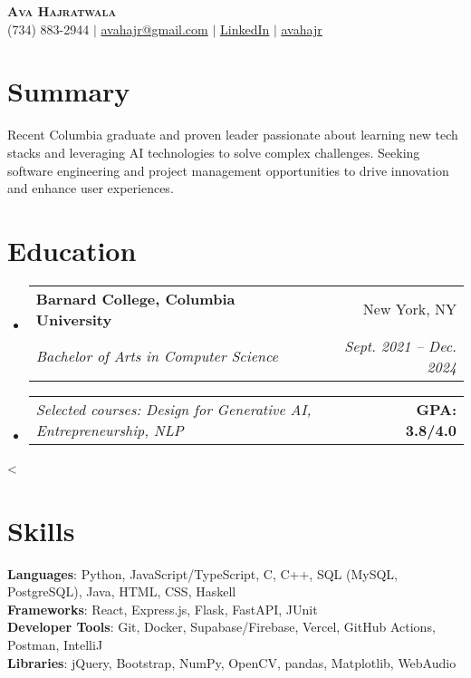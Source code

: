 \documentclass[letterpaper,11pt]{article}
\makeatletter
\newcommand{\resumeSubheading}[4]{
    \vspace{-2pt}\item
    \begin{tabular*}{0.97\textwidth}[t]{l@{\extracolsep{\fill}}r}
    \textbf{#1} & #2 \\
    \textit{\small#3} & \textit{\small #4} \\
    \end{tabular*}\vspace{-7pt}
}
\newcommand{\relevantCourseWorkAndGPA}[2]{
    \item
    \begin{tabular*}{0.97\textwidth}{l@{\extracolsep{\fill}}r}
    \textit{Selected courses: \small#1} & \textbf{\small GPA: #2/4.0} \\
    \end{tabular*}\vspace{-7pt}
}
\newcommand{\conditionalVspace}[1]{%
\ifnum\value{enumi}<\value{enumii}%
\vspace{#1}%
\fi
}
\newcommand{\resumeSubHeadingListStart}{\begin{itemize}[leftmargin=0.15in, label={}] \setlength{\itemsep}{7pt}}
\newcommand{\resumeSubHeadingListEnd}{\end{itemize}\conditionalVspace{7pt}}
\makeatother
\begin{document}

\begin{center}
\textbf{\Huge \scshape Ava Hajratwala} \\ \vspace{1pt}
\small (734) 883-2944 $|$ \href{mailto:avahajr@gmail.com}{{avahajr@gmail.com}} $|$
\href{https://linkedin.com/in/avahajr}{\color{blue} \underline{LinkedIn}} $|$
{\faGithub} \href{https://github.com/avahajr}{\color{blue}\underline{avahajr}}
\end{center}

\section{Summary}
\small Recent Columbia graduate and proven leader passionate about learning new tech stacks and leveraging AI technologies to solve complex challenges. Seeking software engineering and project management opportunities to drive innovation and enhance user experiences.
\section{Education}
\resumeSubHeadingListStart
\resumeSubheading
{Barnard College, Columbia University}{New York, NY}
{Bachelor of Arts in Computer Science}{Sept. 2021 -- Dec. 2024}
\relevantCourseWorkAndGPA{Design for Generative AI, Entrepreneurship, NLP}{3.8}
\resumeSubHeadingListEnd

\section{Skills}
\begin{itemize}[leftmargin=0.15in, label={}]
\small{\item{
\textbf{Languages}{: Python, JavaScript/TypeScript, C, C++, SQL (MySQL, PostgreSQL), Java, HTML, CSS, Haskell} \\
\textbf{Frameworks}{: React, Express.js, Flask, FastAPI, JUnit } \\
\textbf{Developer Tools}{: Git, Docker, Supabase/Firebase, Vercel, GitHub Actions, Postman, IntelliJ} \\
\textbf{Libraries}{: jQuery, Bootstrap, NumPy, OpenCV, pandas, Matplotlib, WebAudio}
}}
\end{itemize}
\end{document}
